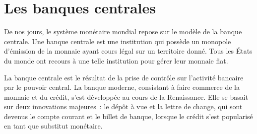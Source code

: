 %
%

\section*{Les banques centrales}

De nos jours, le système monétaire mondial repose sur le modèle de la banque centrale. Une banque centrale est une institution qui possède un monopole d'émission de la monnaie ayant cours légal sur un territoire donné. Tous les États du monde ont recours à une telle institution pour gérer leur monnaie fiat.

La banque centrale est le résultat de la prise de contrôle sur l'activité bancaire par le pouvoir central. La banque moderne, consistant à faire commerce de la monnaie et du crédit, s'est développée au cours de la Renaissance. Elle se basait sur deux innovations majeures~: le dépôt à vue et la lettre de change, qui sont devenus le compte courant et le billet de banque, lorsque le crédit s'est popularisé en tant que substitut monétaire.

